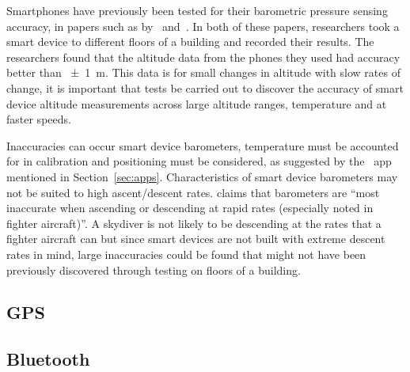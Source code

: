 \documentclass[twocolumn]{article}
\begin{document}
Smartphones have previously been tested for their barometric pressure sensing accuracy, in papers such as by~\textcite{keller_calibration_2012} and~\textcite{he_atmospheric_2012}. In both of these papers, researchers took a smart device to different floors of a building and recorded their results. The researchers found that the altitude data from the phones they used had accuracy better than \SI{\pm1}{\metre}. This data is for small changes in altitude with slow rates of change, it is important that tests be carried out to discover the accuracy of smart device altitude measurements across large altitude ranges, temperature and at faster speeds.

Inaccuracies can occur smart device barometers, temperature must be accounted for in calibration and positioning must be considered, as suggested by the~ app mentioned in Section~\ref{sec:apps}. Characteristics of smart device barometers may not be suited to high ascent/descent rates. \textcite{gray_integrated_1995} claims that barometers are ``most inaccurate when ascending or descending at rapid rates (especially noted in fighter aircraft)''. A skydiver is not likely to be descending at the rates that a fighter aircraft can but since smart devices are not built with extreme descent rates in mind, large inaccuracies could be found that might not have been previously discovered through testing on floors of a building.



\subsection{GPS}\label{sec:gps} %



\subsection{Bluetooth}\label{sec:bluetooth} %
\end{document}
